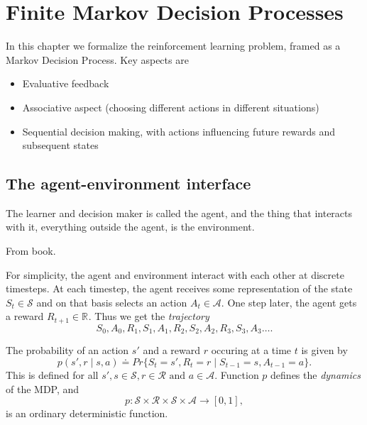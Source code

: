 \chapter
{Finite Markov Decision Processes}
In this chapter we formalize the reinforcement learning problem, framed as a Markov Decision Process. Key aspects are
\begin{itemize}
    \item Evaluative feedback 
    \item Associative aspect (choosing different actions in different situations)
        \item Sequential decision making, with actions influencing future rewards and subsequent states
\end{itemize}
\section{The agent-environment interface}
The learner and decision maker is called the agent, and the thing that interacts with it, everything outside the agent, is the environment.

{From book.} 

For simplicity, the agent and environment interact with each other at discrete timesteps. At each timestep, the agent receives some representation of the state $S_t \in \mathcal{S}$ and on that basis selects an action $A_t\in \mathcal{A}$. One step later, the agent gets a reward $R_{t+1}\in \mathbb{R}^{}$. Thus we get the \textit{trajectory} \[
S_0,A_0,R_1,S_1,A_1,R_2,S_2,A_2,R_3,S_3, A_3\ldots
.\] 


The probability of an action $s'$ and a reward $r$ occuring at a time $t$ is given by
\begin{equation}
\label{e.s'r}
p(s',r \mid s,a) \doteq Pr \{S_t=s', R_t=r  \mid S_{t-1}=s, A_{t-1}=a\} 
.\end{equation}
This is defined for all $s',s\in \mathcal{S}, r\in \mathcal{R} \text{ and }a\in \mathcal{A}$. Function $p$ defines the \textit{dynamics} of the MDP, and \[
    p: \mathcal{S}\times \mathcal{R}\times \mathcal{S}\times \mathcal{A} \rightarrow [0,1]
,\] 
is an ordinary deterministic function.

